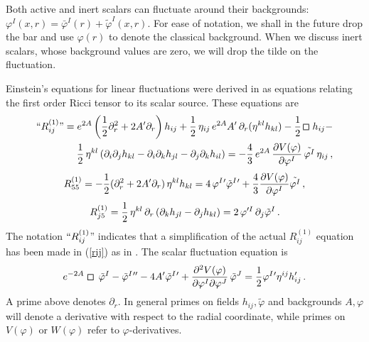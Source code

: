 \documentclass[a4paper,12pt]{article}
\def\varphit{\tilde{\varphi}}
\def\sqr#1#2{{\vcenter{\vbox{\hrule height.#2pt
         \hbox{\vrule width.#2pt height#1pt \kern#1pt
            \vrule width.#2pt}
         \hrule height.#2pt}}}}
\def\square{\mathop{\mathchoice\sqr56\sqr56\sqr{3.75}4\sqr34\,}\nolimits}
\begin{document}
Both active and inert scalars can fluctuate around their backgrounds:
$\varphi^I(x, r) = \bar\varphi^I(r) + \varphit^I(x,r)$.  For ease of
notation, we shall in the future drop the bar and use $\varphi(r)$ to
denote the classical background.  When we discuss inert scalars, whose
background values are zero, we will drop the tilde on the fluctuation.

Einstein's equations for linear fluctuations were derived in \cite{dfgk}
as equations relating the first order Ricci tensor to its scalar source.
These equations are
\begin{eqnarray}
\label{rij}
``R^{(1)}_{ij}\mbox{''} = e^{2 A} \left(\frac{1}{2} \partial_r^2 + 2
A' \partial_r \right) h_{ij} + {1 \over 2} \, \eta_{ij} \, e^{2A} A'
\, \partial_r (\eta^{kl} h_{kl}) - {1 \over 2} \square h_{ij} - \\
\frac{1}{2} \, \eta^{kl} \left( \partial_i \partial_j h_{kl} -
\partial_i \partial_k h_{jl} - \partial_j \partial_k h_{il} \right) =
-{4 \over 3}\, e^{2A} \, {\partial V(\varphi) \over \partial
\varphi^I} \, \tilde{\varphi^I}\, \eta_{ij} \,, \nonumber
\end{eqnarray}
\begin{eqnarray}
\label{r55}
R^{(1)}_{55} = - {1 \over 2} (\partial_r^2 + 2 A'
\partial_r) \, \eta^{kl} h_{kl} = 4 \,  \varphi^I{}' \tilde{\varphi}^I{}' 
+ {4 \over 3}
  {\partial V(\varphi) \over \partial \varphi^I} 
   \tilde{\varphi^I} \,, 
\end{eqnarray}
\begin{eqnarray}
\label{rj5}
R^{(1)}_{j5} = {1 \over 2}\, \eta^{kl}\, \partial_r\, (\partial_k h_{jl} - \partial_j
h_{kl})  = 2 \, \varphi'^I \, \partial_j \tilde\varphi^I \,.
\end{eqnarray}
The notation $``R^{(1)}_{ij}$'' indicates that a simplification of the
 actual $R^{(1)}_{ij}$ equation has been made in (\ref{rij}) as in
 \cite{dfgk}.  The scalar fluctuation equation is
\begin{eqnarray}
\label{kg}
e^{-2A} \, \square \, \tilde{\varphi}^I - \tilde{\varphi}^I{}'' - 4 A' 
 \tilde{\varphi}^I{}' +  {\partial^2 V(\varphi) \over \partial \varphi^I \partial \varphi^J} 
  \,  \tilde{\varphi}^J = {1 \over 2} \varphi^I{}'
  \eta^{ij} h_{ij}' \,.
\end{eqnarray}
A prime above denotes $\partial_r$.  In general primes on fields
$h_{ij}, \varphit$ and backgrounds $A, \varphi$ will denote a derivative
with respect to the radial coordinate, while primes on $V(\varphi)$
or $W(\varphi)$ refer to $\varphi$-derivatives.  
\end{document}
